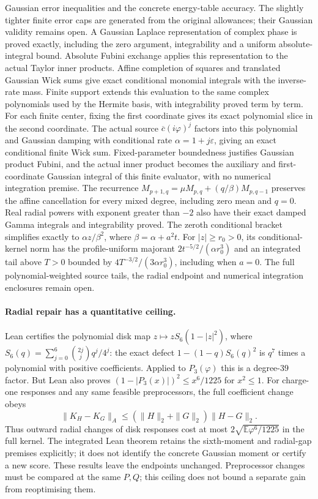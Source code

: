 \documentclass[11pt,a4paper]{article}
\newcommand{\E}{\mathbb{E}}
\begin{document}
Gaussian error inequalities and the concrete energy-table accuracy. The
slightly tighter finite error caps are generated from the original allowances;
their Gaussian validity remains open.
A Gaussian Laplace representation of complex phase is proved exactly,
including the zero argument, integrability and a uniform absolute-integral
bound. Absolute Fubini exchange applies this representation to the actual
Taylor inner products. Affine completion of squares and translated Gaussian
Wick sums give exact conditional monomial integrals with the inverse-rate mass.
Finite support extends this evaluation to the same complex polynomials used
by the Hermite basis, with integrability proved term by term.
For each finite center, fixing the first coordinate gives its exact polynomial
slice in the second coordinate. The actual source $\overline c(i\varphi)^j$
factors into this polynomial and Gaussian damping with conditional rate
$\alpha=1+j\varepsilon$, giving an exact conditional finite Wick sum.
Fixed-parameter boundedness justifies Gaussian product Fubini, and the actual
inner product becomes the auxiliary and first-coordinate Gaussian integral
of this finite evaluator, with no numerical integration premise.
The recurrence $M_{p+1,q}=\mu M_{p,q}+(q/\beta)M_{p,q-1}$ preserves the affine
cancellation for every mixed degree, including zero mean and $q=0$.
Real radial powers with exponent greater than $-2$ also have their exact
damped Gamma integrals and integrability proved.
The zeroth conditional bracket simplifies exactly to $\alpha z/\beta^2$,
where $\beta=\alpha+a^2t$. For $|z|\ge r_0>0$, its conditional-kernel norm
has the profile-uniform majorant $2t^{-5/2}/(\alpha r_0^3)$ and an integrated
tail above $T>0$ bounded by $4T^{-3/2}/(3\alpha r_0^3)$, including when $a=0$.
The full polynomial-weighted source tails, the radial endpoint and numerical
integration enclosures remain open.

\paragraph{Radial repair has a quantitative ceiling.}
Lean certifies the polynomial disk map $z\mapsto zS_6(1-|z|^2)$, where
$S_6(q)=\sum_{j=0}^6\binom{2j}{j}q^j/4^j$:
the exact defect $1-(1-q)S_6(q)^2$ is $q^7$ times a polynomial with positive
coefficients. Applied to $P_3(\varphi)$ this is a degree-$39$ factor.
But Lean also proves $(1-|P_3(x)|)^2\le x^6/1225$ for $x^2\le1$.
For charge-one responses and any same feasible preprocessors, the full coefficient change obeys
\[
 \|K_H-K_G\|_A\le(\|H\|_2+\|G\|_2)\|H-G\|_2.
\]
Thus outward radial changes of disk responses cost at most
$2\sqrt{\E\varphi^6/1225}$ in the full kernel. The integrated Lean theorem
retains the sixth-moment and radial-gap premises explicitly; it does not
identify the concrete Gaussian moment or certify a new score. These results
leave the endpoints unchanged. Preprocessor changes must be compared at the
same $P,Q$; this ceiling does not bound a separate gain from reoptimising them.
\end{document}
